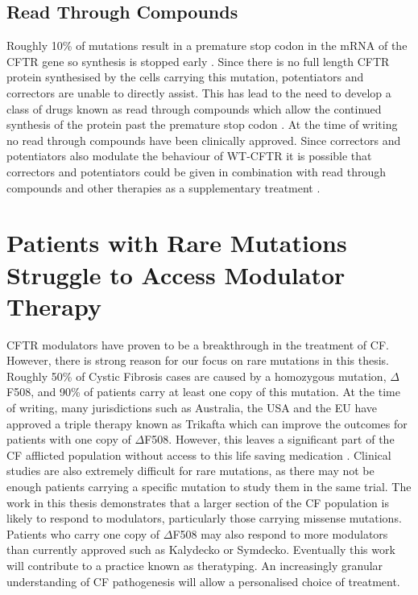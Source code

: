 \subsection{Read Through Compounds}
Roughly 10\% of mutations result in a premature stop codon in the mRNA of the CFTR gene so synthesis is stopped early \cite{}. Since there is no full length CFTR protein synthesised by the cells carrying this mutation, potentiators and correctors are unable to directly assist. This has lead to the need to develop a class of drugs known as read through compounds which allow the continued synthesis of the protein past the premature stop codon \cite{}. At the  time of writing no read through compounds have been clinically approved. Since correctors and potentiators also modulate the behaviour of WT-CFTR it is possible that correctors and potentiators could be given in combination with read through compounds and other therapies as a supplementary treatment \cite{}.

\section{Patients with Rare Mutations Struggle to Access Modulator Therapy}
CFTR modulators have proven to be a breakthrough in the treatment of CF. However, there is strong reason for our focus on rare mutations in this thesis. Roughly 50\% of Cystic Fibrosis cases are caused by a homozygous mutation, $\Delta$F508, and 90\% of patients carry at least one copy of this mutation. At the time of writing, many jurisdictions such as Australia, the USA and the EU have approved a triple therapy known as Trikafta which can improve the outcomes for patients with one copy of $\Delta$F508. However, this leaves a significant part of the CF afflicted population without access to this life saving medication \cite{administration2021, trikafta_website}. Clinical studies are also extremely difficult for rare mutations, as there may not be enough patients carrying a specific mutation to study them in the same trial. The work in this thesis demonstrates that a larger section of the CF population is likely to respond to modulators, particularly those carrying missense mutations. Patients who carry one copy of $\Delta$F508 may also respond to more modulators than currently approved such as Kalydecko or Symdecko. Eventually this work will contribute to a practice known as theratyping. An increasingly granular understanding of CF pathogenesis will allow a personalised choice of treatment.

